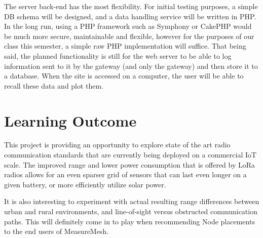 \documentclass{IEEEtran}
\begin{document}
The server back-end has the most flexibility. For initial testing purposes, a simple DB schema will be designed, and a data handling service will be written in PHP. In the long run, using a PHP framework such as Symphony or CakePHP would be much more secure, maintainable and flexible, however for the purposes of our class this semester, a simple raw PHP implementation will suffice. That being said, the planned functionality is still for the web server to be able to log information sent to it by the gateway (and only the gateway) and then store it to a database. When the site is accessed on a computer, the user will be able to recall these data and plot them.

\section{Learning Outcome}

This project is providing an opportunity to explore state of the art radio communication standards that are currently being deployed on a commercial IoT scale. The improved range and lower power consumption that is offered by LoRa radios allows for an even sparser grid of sensors that can last even longer on a given battery, or more efficiently utilize solar power. 

It is also interesting to experiment with actual resulting range differences between urban and rural environments, and line-of-sight versus obstructed communication paths. This will definitely come in to play when recommending Node placements to the end users of MeasureMesh.




\end{document}
